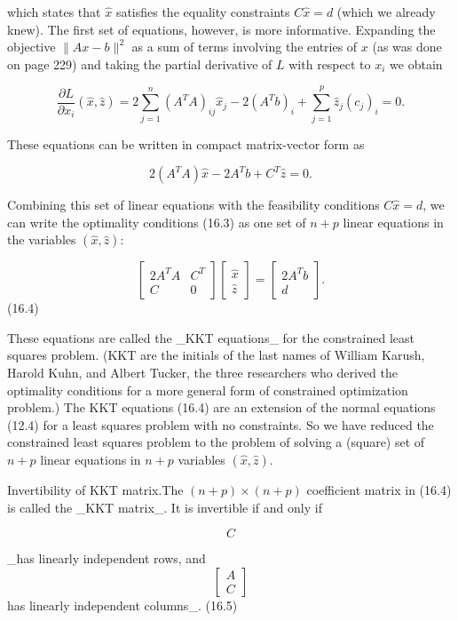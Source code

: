 which states that \(\hat{x}\) satisfies the equality constraints \(C\hat{x}=d\) (which we already knew). The first set of equations, however, is more informative. Expanding the objective \(\|Ax-b\|^{2}\) as a sum of terms involving the entries of \(x\) (as was done on page 229) and taking the partial derivative of \(L\) with respect to \(x_{i}\) we obtain

\[\frac{\partial L}{\partial x_{i}}(\hat{x},\hat{z})=2\sum_{j=1}^{n}(A^{T}A)_{ij }\hat{x}_{j}-2(A^{T}b)_{i}+\sum_{j=1}^{p}\hat{z}_{j}(c_{j})_{i}=0.\]

These equations can be written in compact matrix-vector form as

\[2(A^{T}A)\hat{x}-2A^{T}b+C^{T}\hat{z}=0.\]

Combining this set of linear equations with the feasibility conditions \(C\hat{x}=d\), we can write the optimality conditions (16.3) as one set of \(n+p\) linear equations in the variables \((\hat{x},\hat{z})\):

\[\left[\begin{array}{cc}2A^{T}A&C^{T}\\ C&0\end{array}\right]\left[\begin{array}{c}\hat{x}\\ \hat{z}\end{array}\right]=\left[\begin{array}{c}2A^{T}b\\ d\end{array}\right].\] (16.4)

These equations are called the _KKT equations_ for the constrained least squares problem. (KKT are the initials of the last names of William Karush, Harold Kuhn, and Albert Tucker, the three researchers who derived the optimality conditions for a more general form of constrained optimization problem.) The KKT equations (16.4) are an extension of the normal equations (12.4) for a least squares problem with no constraints. So we have reduced the constrained least squares problem to the problem of solving a (square) set of \(n+p\) linear equations in \(n+p\) variables \((\hat{x},\hat{z})\).

Invertibility of KKT matrix.The \((n+p)\times(n+p)\) coefficient matrix in (16.4) is called the _KKT matrix_. It is invertible if and only if

\[C\]

_has linearly independent rows, and \[\left[\begin{array}{c}A\\ C\end{array}\right]\] has linearly independent columns_. (16.5)

